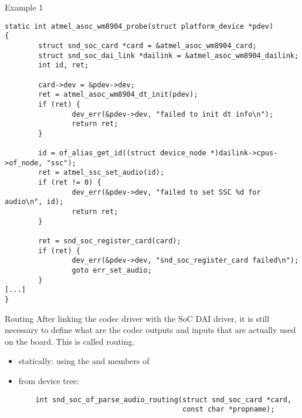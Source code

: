 \begin{frame}[fragile]{Example 1}
  \begin{block}{}
    \fontsize{8}{8}\selectfont
    \begin{verbatim}
static int atmel_asoc_wm8904_probe(struct platform_device *pdev)
{
        struct snd_soc_card *card = &atmel_asoc_wm8904_card;
        struct snd_soc_dai_link *dailink = &atmel_asoc_wm8904_dailink;
        int id, ret;

        card->dev = &pdev->dev;
        ret = atmel_asoc_wm8904_dt_init(pdev);
        if (ret) {
                dev_err(&pdev->dev, "failed to init dt info\n");
                return ret;
        }

        id = of_alias_get_id((struct device_node *)dailink->cpus->of_node, "ssc");
        ret = atmel_ssc_set_audio(id);
        if (ret != 0) {
                dev_err(&pdev->dev, "failed to set SSC %d for audio\n", id);
                return ret;
        }

        ret = snd_soc_register_card(card);
        if (ret) {
                dev_err(&pdev->dev, "snd_soc_register_card failed\n");
                goto err_set_audio;
        }
[...]
}
    \end{verbatim}
  \end{block}
\end{frame}

\begin{frame}[fragile]{Routing}
  After linking the codec driver with the SoC DAI driver, it is still
  necessary to define what are the codec outputs and inputs that are
  actually used on the board. This is called routing.

  \begin{itemize}
  \item statically: using the  and
     members of 
  \item from device tree:
    \begin{verbatim}
    int snd_soc_of_parse_audio_routing(struct snd_soc_card *card,
                                       const char *propname);
    \end{verbatim}
  \end{itemize}
\end{frame}

